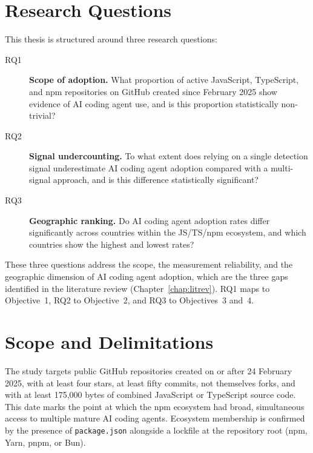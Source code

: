 \section{Research Questions}
\label{sec:intro:rqs}

This thesis is structured around three research questions:

\begin{description}
  \item[RQ1] \textbf{Scope of adoption.}
    What proportion of active JavaScript, TypeScript, and npm repositories on
    GitHub created since February 2025 show evidence of AI coding agent use,
    and is this proportion statistically non-trivial?

  \item[RQ2] \textbf{Signal undercounting.}
    To what extent does relying on a single detection signal underestimate AI
    coding agent adoption compared with a multi-signal approach, and is this
    difference statistically significant?

  \item[RQ3] \textbf{Geographic ranking.}
    Do AI coding agent adoption rates differ significantly across countries
    within the JS/TS/npm ecosystem, and which countries show the highest and
    lowest rates?

\end{description}

These three questions address the scope, the measurement reliability, and the
geographic dimension of AI coding agent adoption, which are the three gaps
identified in the literature review (Chapter~\ref{chap:litrev}). RQ1 maps to
Objective~1, RQ2 to Objective~2, and RQ3 to Objectives~3 and~4.

\section{Scope and Delimitations}
\label{sec:intro:scope}

The study targets public GitHub repositories created on or after
24 February 2025, with at least four stars, at least fifty commits, not
themselves forks, and with at least 175,000 bytes of combined JavaScript or
TypeScript source code. This date marks the point at which the npm ecosystem
had broad, simultaneous access to multiple mature AI coding agents. Ecosystem
membership is confirmed by the presence of \texttt{package.json} alongside a
lockfile at the repository root (npm, Yarn, pnpm, or Bun).

